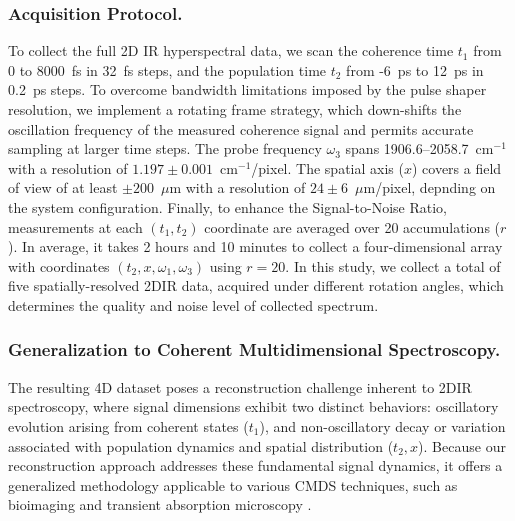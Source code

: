 \documentclass{optica-article}
\begin{document}
\subsubsection{Acquisition Protocol.} 
To collect the full 2D IR hyperspectral data, we scan the coherence time $t_1$ from 0 to 8000~fs in 32~fs steps, and the population time $t_2$ from -6~ps to 12~ps in 0.2~ps steps. To overcome bandwidth limitations imposed by the pulse shaper resolution, we implement a rotating frame strategy, which down-shifts the oscillation frequency of the measured coherence signal and permits accurate sampling at larger time steps. The probe frequency $\omega_3$ spans 1906.6--2058.7~cm$^{-1}$ with a resolution of $1.197 \pm 0.001$~cm$^{-1}$/pixel. The spatial axis ($x$) covers a field of view of at least $\pm 200$~$\mu$m with a resolution of $24 \pm 6$~$\mu$m/pixel, depnding on the system configuration. Finally, to enhance the Signal-to-Noise Ratio, measurements at each $(t_1, t_2)$ coordinate are averaged over 20 accumulations ($r$). In average, it takes 2 hours and 10 minutes to collect a four-dimensional array with coordinates $(t_2, x, \omega_1, \omega_3)$ using $r=20$. In this study, we collect a total of five spatially-resolved 2DIR data, acquired under different rotation angles, which determines the quality and noise level of collected spectrum.

\subsubsection{Generalization to Coherent Multidimensional Spectroscopy.}
The resulting 4D dataset poses a reconstruction challenge inherent to 2DIR spectroscopy, where signal dimensions exhibit two distinct behaviors: oscillatory evolution arising from coherent states ($t_1$), and non-oscillatory decay or variation associated with population dynamics and spatial distribution ($t_2, x$). Because our reconstruction approach addresses these fundamental signal dynamics, it offers a generalized methodology applicable to various CMDS techniques, such as bioimaging \cite{dicke2021application, tiwari2018spatially} and transient absorption microscopy \cite{zhu2020transient, gross2023progress}.


\end{document}
